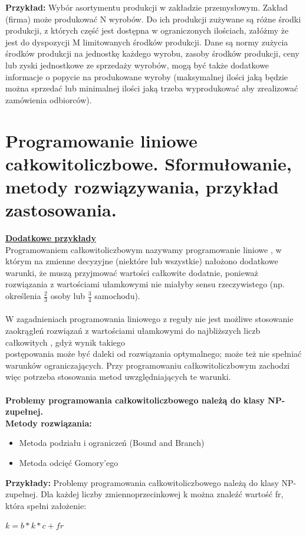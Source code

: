 \documentclass[10pt, a
4paper]{article}
\begin{document}
\textbf{Przykład:}
Wybór asortymentu produkcji w zakładzie przemysłowym. Zakład (firma) może produkować N wyrobów. Do ich produkcji zużywane są różne środki produkcji, z których część jest dostępna w ograniczonych ilościach, załóżmy że jest do dyspozycji M limitowanych środków produkcji. Dane są normy zużycia środków produkcji na jednostkę każdego wyrobu, zasoby środków produkcji, ceny lub zyski jednostkowe ze sprzedaży wyrobów, mogą być także dodatkowe informacje o popycie na produkowane wyroby (maksymalnej ilości jaką będzie można sprzedać lub minimalnej ilości jaką trzeba wyprodukować aby zrealizować zamówienia odbiorców).


\newpage
\section{Programowanie liniowe całkowitoliczbowe. Sformułowanie, metody rozwiązywania,
przykład zastosowania.}
\textbf{\href{http://tarapata.strefa.pl/p_ekonometria/download/ekonometria\%20_cz3_1a.pdf}{Dodatkowe przykłady}} \\
Programowaniem całkowitoliczbowym nazywamy programowanie liniowe , w którym na
zmienne decyzyjne (niektóre lub wszystkie) nałożono dodatkowe warunki, że muszą
przyjmować wartości całkowite dodatnie, ponieważ rozwiązania z wartościami ułamkowymi
nie miałyby sensu rzeczywistego (np. określenia $\frac{2}{3}$ osoby lub $\frac{3}{4}$ samochodu).\\\\
W zagadnieniach programowania liniowego z reguły nie jest możliwe stosowanie zaokrągleń
rozwiązań z wartościami ułamkowymi do najbliższych liczb całkowitych , gdyż wynik takiego\\
postępowania może być daleki od rozwiązania optymalnego; może też nie spełniać
warunków ograniczających. Przy programowaniu całkowitoliczbowym zachodzi więc
potrzeba stosowania metod uwzględniających te warunki.\\\\
\textbf{Problemy programowania całkowitoliczbowego należą do klasy NP-zupełnej.}\\

\textbf{Metody rozwiązania:}
\begin{itemize}
\item Metoda podziału i ograniczeń (Bound and Branch)
\item Metoda odcięć Gomory’ego
\end{itemize}

\textbf{Przykłady:}
Problemy programowania całkowitoliczbowego należą do klasy NP-zupełnej.
Dla każdej liczby zmiennoprzecinkowej k można znaleźć wartość fr, która spełni założenie:
\begin{center}
$k = b*k*c + fr$\\
\end{center}
\end{document}
